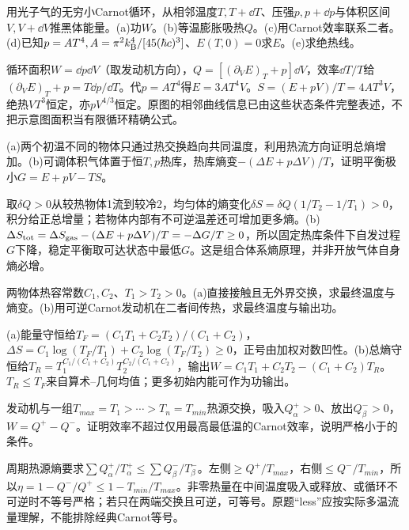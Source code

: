 \begin{exercise}[原题4(a)--(e)]\label{p:333-1-4}
用光子气的无穷小Carnot循环，从相邻温度$T,T+\dd T$、压强$p,p+\dd p$与体积区间$V,V+\dd V$推黑体能量。(a)功$W$。(b)等温膨胀吸热$Q$。(c)用Carnot效率联系二者。(d)已知$p=AT^4,A=\pi^2k_{\mathrm B}^4/[45(\hbar c)^3]$、$E(T,0)=0$求$E$。(e)求绝热线。
\end{exercise}
\begin{solution}
循环面积$W=\dd p\dd V$（取发动机方向），$Q=[(\partial_VE)_T+p]\dd V$，效率$\dd T/T$给$(\partial_VE)_T+p=T\dd p/\dd T$。代$p=AT^4$得$E=3AT^4V$。$S=(E+pV)/T=4AT^3V$，绝热$VT^3$恒定，亦$pV^{4/3}$恒定。原图的相邻曲线信息已由这些状态条件完整表述，不把示意图面积当有限循环精确公式。
\end{solution}
\begin{exercise}[原题5(a)--(b)]\label{p:333-1-5}
(a)两个初温不同的物体只通过热交换趋向共同温度，利用热流方向证明总熵增加。(b)可调体积气体置于恒$T,p$热库，热库熵变$-(\Delta E+p\Delta V)/T$，证明平衡极小$G=E+pV-TS$。
\end{exercise}
\begin{solution}
取$\delta Q>0$从较热物体1流到较冷2，均匀体的熵变化$\delta S=\delta Q(1/T_2-1/T_1)>0$，积分给正总增量；若物体内部有不可逆温差还可增加更多熵。(b)$\Delta S_{\rm tot}=\Delta S_{\rm gas}-(\Delta E+p\Delta V)/T=-\Delta G/T\ge0$，所以固定热库条件下自发过程$G$下降，稳定平衡取可达状态中最低$G$。这是组合体系熵原理，并非开放气体自身熵必增。
\end{solution}
\begin{exercise}[原题6(a)--(b)]\label{p:333-1-6}
两物体热容常数$C_1,C_2$、$T_1>T_2>0$。(a)直接接触且无外界交换，求最终温度与熵变。(b)用可逆Carnot发动机在二者间传热，求最终温度与输出功。
\end{exercise}
\begin{solution}
(a)能量守恒给$T_F=(C_1T_1+C_2T_2)/(C_1+C_2)$，$\Delta S=C_1\log(T_F/T_1)+C_2\log(T_F/T_2)\ge0$，正号由加权对数凹性。(b)总熵守恒给$T_R=T_1^{C_1/(C_1+C_2)}T_2^{C_2/(C_1+C_2)}$，输出$W=C_1T_1+C_2T_2-(C_1+C_2)T_R$。$T_R\le T_F$来自算术--几何均值；更多初始内能可作为功输出。
\end{solution}
\begin{exercise}[原题7]\label{p:333-1-7}
发动机与一组$T_{max}=T_1>\cdots>T_n=T_{min}$热源交换，吸入$Q_\alpha^+>0$、放出$Q_\beta^->0$，$W=Q^+-Q^-$。证明效率不超过仅用最高最低温的Carnot效率，说明严格小于的条件。
\end{exercise}
\begin{solution}
周期热源熵要求$\sum Q_\alpha^+/T_\alpha^+\le\sum Q_\beta^-/T_\beta^-$。左侧$\ge Q^+/T_{max}$，右侧$\le Q^-/T_{min}$，所以$\eta=1-Q^-/Q^+\le1-T_{min}/T_{max}$。非零热量在中间温度吸入或释放、或循环不可逆时不等号严格；若只在两端交换且可逆，可等号。原题“less”应按实际多温流量理解，不能排除经典Carnot等号。
\end{solution}
